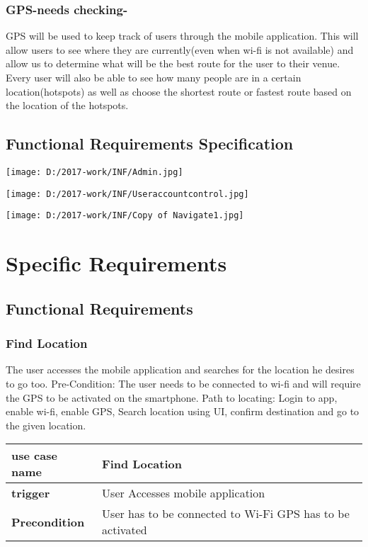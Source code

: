 \documentclass{article}
\begin{document}
\subsubsection{GPS-needs checking-}
GPS will be used to keep track of users through the mobile application. This will allow users to see where they are currently(even when wi-fi is not available) and allow us to determine what will be the best route for the user to their venue. Every user will also be able to see how many people are in a certain location(hotspots) as well as choose the shortest route or fastest route based on the location of the hotspots.
\subsection {Functional Requirements Specification}
\begin{center}
\texttt{[image: D:/2017-work/INF/Admin.jpg]}

\texttt{[image: D:/2017-work/INF/Useraccountcontrol.jpg]}
\newpage

\texttt{[image: D:/2017-work/INF/Copy of Navigate1.jpg]}
\newpage
\centering
\section{Specific Requirements}
\subsection{Functional Requirements}
\subsubsection{Find Location}
The user accesses the mobile application and searches for the location he desires to go too. Pre-Condition: The user needs to be connected to wi-fi and will require the GPS to be activated on the smartphone. Path to locating: Login to app, enable wi-fi, enable GPS, Search location using UI, confirm destination and go to the given location.

\begin{tabu} to 0.8\textwidth { | X[l] | X[c]| }
 \hline

\textbf{use case name} & Find Location \\
 \hline
\textbf{trigger} & User Accesses mobile application    \\
 \hline
\textbf{Precondition} &User has to be connected to Wi-Fi
GPS has to be activated



\end{tabu}
\end{center}
\end{document}
